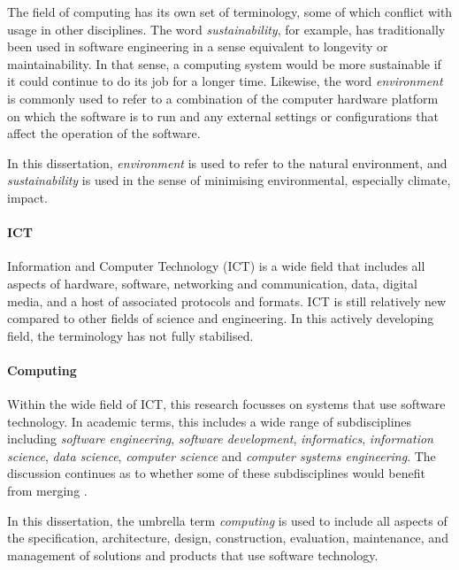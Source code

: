 The field of computing has its own set of terminology, some of which conflict with usage in other disciplines. The word \emph{sustainability}, for example, has traditionally been used in software engineering in a sense equivalent to longevity or maintainability. In that sense, a computing system would be more sustainable if it could continue to do its job for a longer time. Likewise, the word \emph{environment} is commonly used to refer to a combination of the computer hardware platform on which the software is to run and any external settings or configurations that affect the operation of the software. 

\label{def:sustainability}
\begin{leftbar}
In this dissertation, \emph{environment} is used to refer to the natural environment, and \emph{sustainability} is used in the sense of minimising environmental, especially climate, impact.
\end{leftbar}

\paragraph{\gls{ICT}}
Information and Computer Technology (\gls{ICT}) is a wide field that includes all aspects of hardware, software, networking and communication, data, digital media, and a host of associated protocols and formats. \gls{ICT} is still relatively new compared to other fields of science and engineering. In this actively developing field, the terminology has not fully stabilised.

\paragraph{Computing}
Within the wide field of \gls{ICT}, this research focusses on systems that use software technology. In academic terms, this includes a wide range of subdisciplines including \emph{\gls{software engineering}}, \emph{\gls{software development}}, \emph{\gls{informatics}}, \emph{\gls{information science}}, \emph{\gls{data science}}, \emph{\gls{computer science}} and \emph{\gls{computer systems engineering}}. The discussion continues as to whether some of these subdisciplines would benefit from merging \citep{Fitzgerald2024}.

\begin{leftbar}
In this dissertation, the umbrella term \emph{\gls{computing}} is used to include all aspects of the specification, architecture, design, construction, evaluation, maintenance, and management of solutions and products that use software technology.
\end{leftbar}

